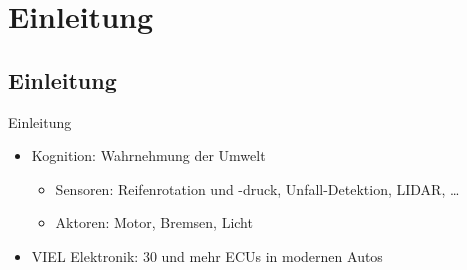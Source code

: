 \section{Einleitung}

\subsection{Einleitung}


\begin{frame}{Einleitung}
    \begin{itemize}[<+->]
        \item Kognition: Wahrnehmung der Umwelt
        \begin{itemize}
            \item Sensoren: Reifenrotation und -druck, Unfall-Detektion, LIDAR, \dots
            \item Aktoren: Motor, Bremsen, Licht
        \end{itemize}
        \item VIEL Elektronik: 30 und mehr ECUs in modernen Autos
    \end{itemize}
\end{frame}